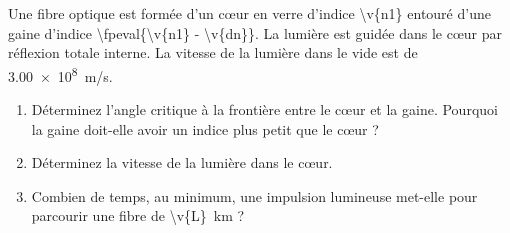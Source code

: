 Une fibre optique est formée d'un cœur en verre d'indice \num{\v{n1}} entouré d'une gaine d'indice \num[minimum-decimal-digits=2]{\fpeval{\v{n1} - \v{dn}}}. La lumière est guidée dans le cœur par réflexion totale interne. La vitesse de la lumière dans le vide est de \qty{3.00e8}{m/s}.

\begin{enumerate}[label=\alph*)]
    \item Déterminez l'angle critique à la frontière entre le cœur et la gaine. Pourquoi la gaine doit-elle avoir un indice plus petit que le cœur ?
    \item Déterminez la vitesse de la lumière dans le cœur.
    \item Combien de temps, au minimum, une impulsion lumineuse met-elle pour parcourir une fibre de \qty{\v{L}}{km} ?
\end{enumerate}
